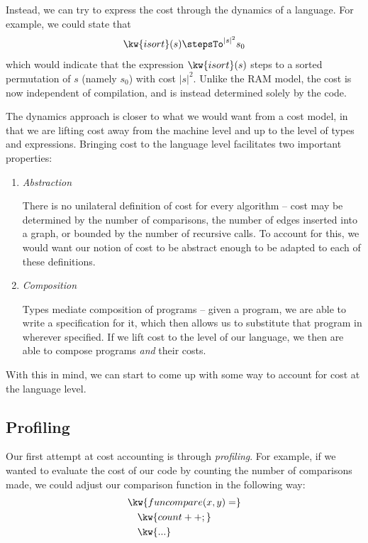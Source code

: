 \documentclass[letterpaper]{article}
\begin{document}
Instead, we can try to express the cost through the dynamics of a language. For example, we could state that 
\[\kw{isort}(s) \stepsTo^{|s|^2} s_0\]
which would indicate that the expression $\kw{isort}(s)$ steps to a sorted permutation of $s$ (namely $s_0$) with cost $|s|^2$. Unlike the RAM model,
the cost is now independent of compilation, and is instead determined solely by the code.

The dynamics approach is closer to what we would want from a cost model, in that we are lifting cost away from the machine level and up to the level of types and expressions. 
Bringing cost to the language level facilitates two important properties:
\begin{enumerate}
    \item \textit{Abstraction}

    There is no unilateral definition of cost for every algorithm -- cost may be determined by the number of comparisons, the number of edges inserted into a graph, or bounded by 
    the number of recursive calls. To account for this, we would want our notion of cost to be abstract enough to be adapted to each of these definitions.

    \item \textit{Composition}

    Types mediate composition of programs -- given a program, we are able to write a specification for it, which then allows us to substitute that program in wherever specified. 
    If we lift cost to the level of our language, we then are able to compose programs \textit{and} their costs.
\end{enumerate}

With this in mind, we can start to come up with some way to account for cost at the language level.

\subsection{Profiling}

Our first attempt at cost accounting is through \textit{profiling}. For example, if we wanted to evaluate the cost
of our code by counting the number of comparisons made, we could adjust our comparison function in the following way:
\begin{align*}
    &\kw{fun compare (x, y) =}\\
    &\quad \kw{count++;}\\
    &\quad \kw{...}
\end{align*}
\end{document}
